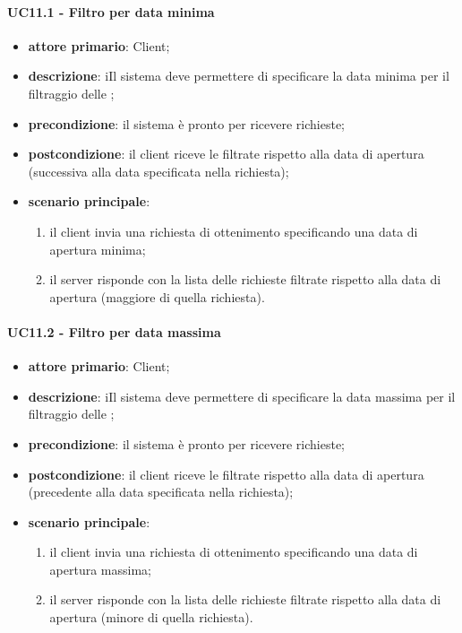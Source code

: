 \paragraph{UC11.1 - Filtro per data minima}
\begin{itemize}
	\item \textbf{attore primario}: Client;
	\item \textbf{descrizione}: iIl sistema deve permettere di specificare la data minima per il filtraggio delle ;
	\item \textbf{precondizione}:  il sistema è pronto per ricevere richieste;
	\item \textbf{postcondizione}: il client riceve le  filtrate rispetto alla data di apertura (successiva alla data specificata nella richiesta);
	\item \textbf{scenario principale}: 
	\begin{enumerate}
		\item  il client invia una richiesta di ottenimento  specificando una data di apertura minima;
		\item  il server risponde con la lista delle  richieste filtrate rispetto alla data di apertura (maggiore di quella richiesta).
	\end{enumerate}
\end{itemize}
\paragraph{UC11.2 - Filtro per data massima}
\begin{itemize}
	\item \textbf{attore primario}: Client;
	\item \textbf{descrizione}: iIl sistema deve permettere di specificare la data massima per il filtraggio delle ;
	\item \textbf{precondizione}:  il sistema è pronto per ricevere richieste;
	\item \textbf{postcondizione}: il client riceve le  filtrate rispetto alla data di apertura (precedente alla data specificata nella richiesta);
	\item \textbf{scenario principale}: 
	\begin{enumerate}
		\item  il client invia una richiesta di ottenimento  specificando una data di apertura massima;
		\item  il server risponde con la lista delle  richieste filtrate rispetto alla data di apertura (minore di quella richiesta).
	\end{enumerate}
\end{itemize}

